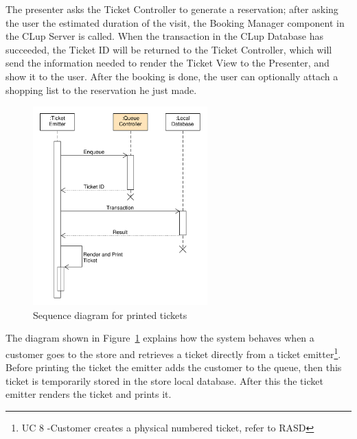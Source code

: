 The presenter asks the Ticket Controller to generate a reservation; after asking the user the estimated duration of the visit, the Booking Manager component in the CLup Server is called.
When the transaction in the CLup Database has succeeded, the Ticket ID will be returned to the Ticket Controller, which will send the information needed to render the Ticket View to the Presenter, and show it to the user. After the booking is done, the user can optionally attach a shopping list to the reservation he just made.
\begin{figure}[H]
    \centering
    \includegraphics[width=0.6\textwidth]{Images/UML_paper_ticket_sequence.pdf}
    \caption{\label{fig:UML_paper_ticket_sequence}Sequence diagram for printed tickets}
\end{figure}

The diagram shown in Figure~\ref{fig:UML_paper_ticket_sequence} explains how the system behaves when a customer goes to the store and retrieves a ticket directly from a ticket emitter\footnote{UC 8 -Customer creates a physical numbered ticket, refer to RASD}. Before printing the ticket the emitter adds the customer to the queue, then this ticket is temporarily stored in the store local database. After this the ticket emitter renders the ticket and prints it.

\clearpage

